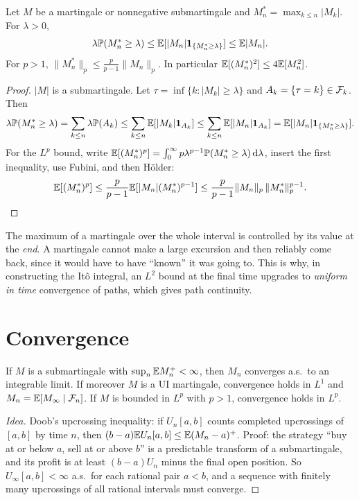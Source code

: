 \begin{theorem}\label{thm:doobmax}
Let $M$ be a martingale or nonnegative submartingale and $M_n^*=\max_{k\le n}|M_k|$. For $\lambda>0$,
\[
\lambda\mathbb{P}(M_n^*\ge\lambda)\le\mathbb{E}[|M_n|\mathbf{1}_{\{M_n^*\ge\lambda\}}]\le\mathbb{E}|M_n|.
\]
For $p>1$, $\|M_n^*\|_p\le\frac{p}{p-1}\|M_n\|_p$. In particular $\mathbb{E}[(M_n^*)^2]\le4\mathbb{E}[M_n^2]$.
\end{theorem}
\begin{proof}
$|M|$ is a submartingale. Let $\tau=\inf\{k:|M_k|\ge\lambda\}$ and $A_k=\{\tau=k\}\in\mathcal{F}_k$. Then
\[
\lambda\mathbb{P}(M_n^*\ge\lambda)=\sum_{k\le n}\lambda\mathbb{P}(A_k)\le\sum_{k\le n}\mathbb{E}[|M_k|\mathbf{1}_{A_k}]\le\sum_{k\le n}\mathbb{E}[|M_n|\mathbf{1}_{A_k}]=\mathbb{E}[|M_n|\mathbf{1}_{\{M_n^*\ge\lambda\}}].
\]
For the $L^p$ bound, write $\mathbb{E}[(M_n^*)^p]=\int_0^\infty p\lambda^{p-1}\mathbb{P}(M_n^*\ge\lambda)\,\mathrm{d}\lambda$, insert the first inequality, use Fubini, and then H\"older:
\[
\mathbb{E}[(M_n^*)^p]\le\frac{p}{p-1}\mathbb{E}[|M_n|(M_n^*)^{p-1}]\le\frac{p}{p-1}\|M_n\|_p\,\|M_n^*\|_p^{p-1}.\qedhere
\]
\end{proof}

\begin{intuition}
The maximum of a martingale over the whole interval is controlled by its value at the \emph{end}. A martingale cannot make a large excursion and then reliably come back, since it would have to have ``known'' it was going to. This is why, in constructing the It\^o integral, an $L^2$ bound at the final time upgrades to \emph{uniform in time} convergence of paths, which gives path continuity.
\end{intuition}

\section{Convergence}

\begin{theorem}\label{thm:martconv}
If $M$ is a submartingale with $\sup_n\mathbb{E} M_n^+<\infty$, then $M_n$ converges a.s.\ to an integrable limit. If moreover $M$ is a UI martingale, convergence holds in $L^1$ and $M_n=\mathbb{E}[M_\infty\mid\mathcal{F}_n]$. If $M$ is bounded in $L^p$ with $p>1$, convergence holds in $L^p$.
\end{theorem}
\begin{proof}[Idea]
Doob's upcrossing inequality: if $U_n[a,b]$ counts completed upcrossings of $[a,b]$ by time $n$, then $(b-a)\mathbb{E} U_n[a,b]\le\mathbb{E}(M_n-a)^+$. Proof: the strategy ``buy at or below $a$, sell at or above $b$'' is a predictable transform of a submartingale, and its profit is at least $(b-a)U_n$ minus the final open position. So $U_\infty[a,b]<\infty$ a.s.\ for each rational pair $a<b$, and a sequence with finitely many upcrossings of all rational intervals must converge.
\end{proof}

